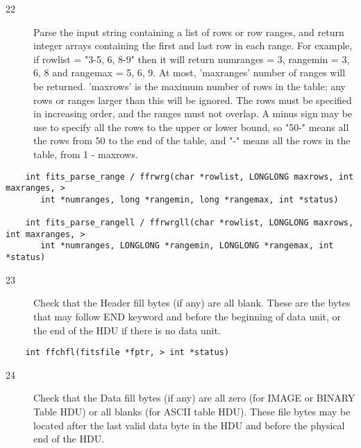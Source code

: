 \documentclass[11pt]{book}
\begin{document}
\begin{description}
\item[22]  Parse the input string containing a list of rows or row ranges, and
     return integer arrays containing the first and last row in each
     range.  For example, if rowlist = "3-5, 6, 8-9" then it will
     return numranges = 3, rangemin = 3, 6, 8 and rangemax = 5, 6, 9.
     At most, 'maxranges' number of ranges will be returned.  'maxrows'
     is the maximum number of rows in the table; any rows or ranges
     larger than this will be ignored.  The rows must be specified in
     increasing order, and the ranges must not overlap. A minus sign
     may be use to specify all the rows to the upper or lower bound, so
     "50-" means all the rows from 50 to the end of the table, and "-"
     means all the rows in the table, from 1 - maxrows.
   \label{ffrwrg}
\end{description}

\begin{verbatim}
    int fits_parse_range / ffrwrg(char *rowlist, LONGLONG maxrows, int maxranges, >
       int *numranges, long *rangemin, long *rangemax, int *status)

    int fits_parse_rangell / ffrwrgll(char *rowlist, LONGLONG maxrows, int maxranges, >
       int *numranges, LONGLONG *rangemin, LONGLONG *rangemax, int *status)
\end{verbatim}

\begin{description}
\item[23]  Check that the Header fill bytes (if any) are all blank.  These are the bytes
     that may follow END keyword and before the beginning of data unit,
     or the end of the HDU if there is no data unit.
   \label{ffchfl}
\end{description}

\begin{verbatim}
    int ffchfl(fitsfile *fptr, > int *status)
\end{verbatim}

\begin{description}
\item[24]  Check that the Data fill bytes (if any) are all zero (for IMAGE or
     BINARY Table HDU) or all blanks (for ASCII table HDU).  These file
     bytes may be located after the last valid data byte in the HDU and
     before the physical end of the HDU.
     \label{ffcdfl}
\end{description}
\end{document}

